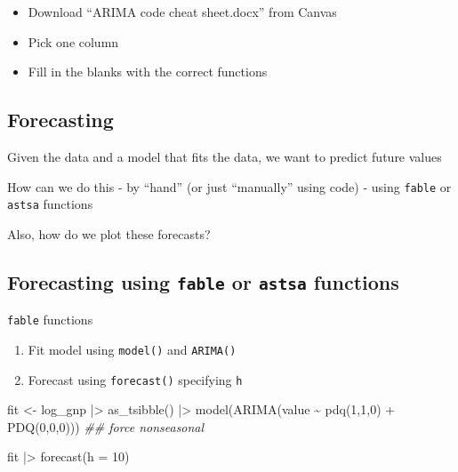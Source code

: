 \documentclass[
  letterpaper,
  DIV=11,
  numbers=noendperiod]{scrartcl}
\newenvironment{Shaded}{\begin{snugshade}}{\end{snugshade}}
\newcommand{\AttributeTok}[1]{\textcolor[rgb]{0.40,0.45,0.13}{#1}}
\newcommand{\DecValTok}[1]{\textcolor[rgb]{0.68,0.00,0.00}{#1}}
\newcommand{\DocumentationTok}[1]{\textcolor[rgb]{0.37,0.37,0.37}{\textit{#1}}}
\newcommand{\FunctionTok}[1]{\textcolor[rgb]{0.28,0.35,0.67}{#1}}
\newcommand{\NormalTok}[1]{\textcolor[rgb]{0.00,0.23,0.31}{#1}}
\newcommand{\OtherTok}[1]{\textcolor[rgb]{0.00,0.23,0.31}{#1}}
\newcommand{\SpecialCharTok}[1]{\textcolor[rgb]{0.37,0.37,0.37}{#1}}
\providecommand{\tightlist}{%
  \setlength{\itemsep}{0pt}\setlength{\parskip}{0pt}}\usepackage{longtable,booktabs,array}
\begin{document}
\begin{itemize}
\tightlist
\item
  Download ``ARIMA code cheat sheet.docx'' from Canvas
\item
  Pick one column
\item
  Fill in the blanks with the correct functions
\end{itemize}

\subsection{Forecasting}\label{forecasting}

Given the data and a model that fits the data, we want to predict future
values

How can we do this - by ``hand'' (or just ``manually'' using code) -
using \texttt{fable} or \texttt{astsa} functions

Also, how do we plot these forecasts?

\subsection{\texorpdfstring{{Forecasting using \texttt{fable} or
\texttt{astsa}
functions}}{Forecasting using fable or astsa functions}}\label{forecasting-using-fable-or-astsa-functions}

\texttt{fable} functions

\begin{enumerate}
\def\labelenumi{\arabic{enumi}.}
\item
  Fit model using \texttt{model()} and \texttt{ARIMA()}
\item
  Forecast using \texttt{forecast()} specifying \texttt{h}
\end{enumerate}

\begin{Shaded}
\begin{Highlighting}[]
\NormalTok{fit }\OtherTok{\textless{}{-}}\NormalTok{ log\_gnp }\SpecialCharTok{|\textgreater{}} 
  \FunctionTok{as\_tsibble}\NormalTok{() }\SpecialCharTok{|\textgreater{}}
  \FunctionTok{model}\NormalTok{(}\FunctionTok{ARIMA}\NormalTok{(value }\SpecialCharTok{\textasciitilde{}} \FunctionTok{pdq}\NormalTok{(}\DecValTok{1}\NormalTok{,}\DecValTok{1}\NormalTok{,}\DecValTok{0}\NormalTok{) }\SpecialCharTok{+} \FunctionTok{PDQ}\NormalTok{(}\DecValTok{0}\NormalTok{,}\DecValTok{0}\NormalTok{,}\DecValTok{0}\NormalTok{))) }\DocumentationTok{\#\# force nonseasonal}

\NormalTok{fit }\SpecialCharTok{|\textgreater{}} \FunctionTok{forecast}\NormalTok{(}\AttributeTok{h =} \DecValTok{10}\NormalTok{)}
\end{Highlighting}
\end{Shaded}
\end{document}
